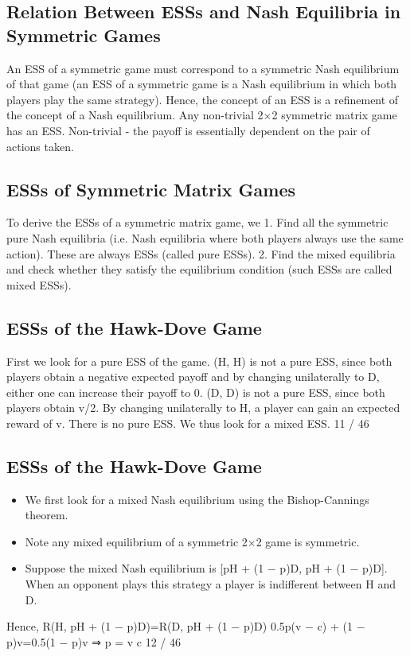 \documentclass[]{report}
\begin{document}
	
\subsection{Relation Between ESSs and Nash Equilibria in Symmetric
	Games}
	An ESS of a symmetric game must correspond to a symmetric
	Nash equilibrium of that game (an ESS of a symmetric game is a
	Nash equilibrium in which both players play the same strategy).
	Hence, the concept of an ESS is a refinement of the concept of a
	Nash equilibrium.
	Any non-trivial 2×2 symmetric matrix game has an ESS.
	Non-trivial - the payoff is essentially dependent on the pair of
	actions taken.
	\subsection{ESSs of Symmetric Matrix Games}
	To derive the ESSs of a symmetric matrix game, we
	1. Find all the symmetric pure Nash equilibria (i.e. Nash
	equilibria where both players always use the same
	action). These are always ESSs (called pure ESSs).
	2. Find the mixed equilibria and check whether they
	satisfy the equilibrium condition (such ESSs are
	called mixed ESSs).
	
	\subsection{ESSs of the Hawk-Dove Game}
	First we look for a pure ESS of the game.
	(H, H) is not a pure ESS, since both players obtain a negative
	expected payoff and by changing unilaterally to D, either one can
	increase their payoff to 0.
	(D, D) is not a pure ESS, since both players obtain v/2. By
	changing unilaterally to H, a player can gain an expected reward of
	v.
	There is no pure ESS. We thus look for a mixed ESS.
	11 / 46
	\subsection{ESSs of the Hawk-Dove Game}
\begin{itemize}
	\item We first look for a mixed Nash equilibrium using the
	Bishop-Cannings theorem.
\item Note any mixed equilibrium of a symmetric 2×2 game is
	symmetric.
\item Suppose the mixed Nash equilibrium is
	[pH + (1 − p)D, pH + (1 − p)D]. When an opponent plays this
	strategy a player is indifferent between H and D.
\end{itemize}	 Hence,
	R(H, pH + (1 − p)D)=R(D, pH + (1 − p)D)
	0.5p(v − c) + (1 − p)v=0.5(1 − p)v ⇒ p =
	v
	c
	12 / 46
	
\end{document}
